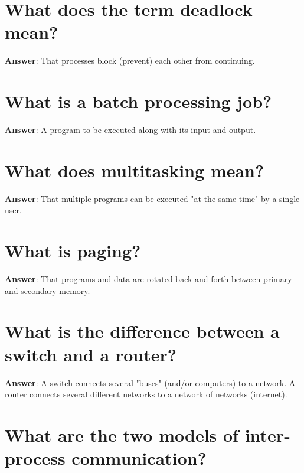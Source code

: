 \documentclass[a4paper,11pt,oneside]{book}
\begin{document}
\begin{sloppypar}
\section{What does the term deadlock mean?}

\label{q:129:sa:en:True}

\textbf{Answer}: That processes block (prevent) each other from continuing.



\section{What is a batch processing job?}

\label{q:130:sa:en:True}

\textbf{Answer}: A program to be executed along with its input and output.



\section{What does multitasking mean?}

\label{q:132:sa:en:True}

\textbf{Answer}: That multiple programs can be executed "at the same time" by a single user.



\section{What is paging?}

\label{q:133:sa:en:True}

\textbf{Answer}: That programs and data are rotated back and forth between primary and secondary memory.



\section{What is the difference between a switch and a router?}

\label{q:134:sa:en:True}

\textbf{Answer}: A switch connects several "buses" (and/or computers) to a network. A router connects several different networks to a network of networks (internet).



\section{What are the two models of inter-process communication?}


\end{sloppypar}
\end{document}
